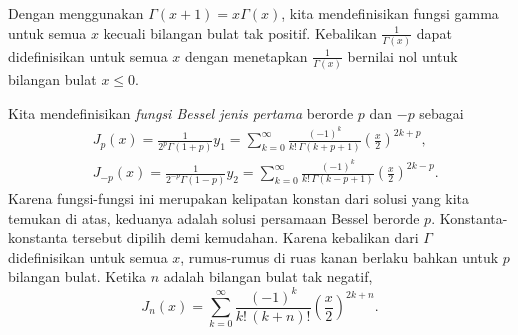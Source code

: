 Dengan menggunakan $\Gamma(x+1) = x \Gamma(x)$,
kita mendefinisikan fungsi gamma untuk 
semua $x$ kecuali bilangan bulat tak positif. 
Kebalikan $\frac{1}{\Gamma(x)}$
dapat didefinisikan untuk semua $x$ dengan menetapkan $\frac{1}{\Gamma(x)}$ bernilai nol
untuk bilangan bulat $x \leq 0$.

Kita mendefinisikan \emph{fungsi Bessel jenis pertama}%
 berorde
$p$ dan $-p$ sebagai
\begin{align*}
& J_p(x) = \frac{1}{2^p\Gamma(1+p)} y_1
=
\sum_{k=0}^\infty
\frac{{(-1)}^k}{k! \, \Gamma(k+p+1)}
{\left(\frac{x}{2}\right)}^{2k+p} ,
\\
& J_{-p}(x) = \frac{1}{2^{-p}\Gamma(1-p)} y_2
=
\sum_{k=0}^\infty
\frac{{(-1)}^k}{k! \,\Gamma(k-p+1)}
{\left(\frac{x}{2}\right)}^{2k-p} .
\end{align*}
Karena fungsi-fungsi ini merupakan kelipatan konstan dari solusi yang kita temukan di atas, keduanya
adalah solusi persamaan Bessel berorde $p$. Konstanta-konstanta tersebut dipilih
demi kemudahan.
Karena kebalikan dari $\Gamma$ didefinisikan untuk semua $x$, rumus-rumus
di ruas kanan berlaku bahkan untuk $p$ bilangan bulat.
Ketika $n$ adalah bilangan bulat tak negatif,
\begin{equation*}
J_n(x) =
\sum_{k=0}^\infty
\frac{{(-1)}^k}{k! \,(k+n)!}
{\left(\frac{x}{2}\right)}^{2k+n} .
\end{equation*}

